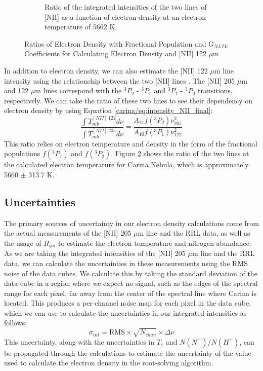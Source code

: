 \begin{figure}
\begin{subfigure}[t]{0.45\textwidth}
        \caption{Ratio of the integrated intensities of the two lines of [NII] as a function of electron density at an electron temperature of 5662 K.}
        \label{carina/fig:nii_curves}
    \end{subfigure}
    \caption{Ratios of Electron Density with Fractional Population and G$_{NLTE}$ Coefficients for Calculating Electron Density and [NII] 122 $\mu$m}
\end{figure}

In addition to electron density, we can also estimate the [NII] 122 $\mu$m line intensity using the relationship between the two [NII] lines \parencite{goldsmith2015herschel}.
The [NII] 205 $\mu$m and 122 $\mu$m lines correspond with the $^3P_2$ - $^3P_1$ and $^3P_1$ - $^3P_0$ transitions, respectively. 
We can take the ratio of these two lines to see their dependency on electron density by using Equation \ref{carina/eq:intensity_NII_final}:
\begin{equation}
    \frac{\int{T_{mb}^{[NII]\ 122}} d\nu}{\int{T_{mb}^{[NII]\ 205}} d\nu} = \frac{A_{21}f(^3P_2)\nu^2_{205}}{A_{10}f(^3P_1)\nu_{122}^2}
    \label{carina/eq:intensity_NII_ratio}
\end{equation}
This ratio relies on electron temperature and density in the form of the fractional populations $f(^3P_1)$ and $f(^3P_2)$.
Figure \ref{carina/fig:nii_curves} shows the ratio of the two lines at the calculated electron temperature for Carina Nebula, which is approximately 5660 $\pm$ 313.7 K.


\subsection{Uncertainties}
The primary sources of uncertainty in our electron density calculations come from the actual measurements of the [NII] 205 $\mu$m line and the RRL data, as well as the usage of $R_{gal}$ to estimate the electron temperature and nitrogen abundance.
As we are taking the integrated intensities of the [NII] 205 $\mu$m line and the RRL data, we can calculate the uncertainties in these measurements using the RMS noise of the data cubes.
We calculate this by taking the standard deviation of the data cube in a region where we expect no signal, such as the edges of the spectral range for each pixel, far away from the center of the spectral line where Carina is located. 
This produces a per-channel noise map for each pixel in the data cube, which we can use to calculate the uncertainties in our integrated intensities as follows:
\begin{equation}
    \sigma_{int} = \text{RMS} \times \sqrt{N_{chan}} \times \Delta \nu
    \label{carina/eq:uncertainty_intensity}
\end{equation}
This uncertainty, along with the uncertainties in $T_e$ and $N(N^+)/N(H^+)$, can be propagated through the calculations to estimate the uncertainty of the value used to calculate the electron density in the root-solving algorithm.

